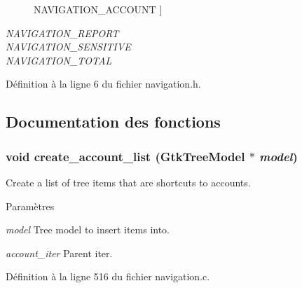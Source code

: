 \begin{Desc}
\begin{description}
{NAVIGATION\_\-ACCOUNT\label{navigation_8h_a3f7cf16a5e5b276a8744f42496c2c441a2bd700dd869e4529a09479b8e3a96cc6}
}]\item[{\em 
NAVIGATION\_\-REPORT\label{navigation_8h_a3f7cf16a5e5b276a8744f42496c2c441ad1379924ed0ede2912107c9394a0ec0e}
}]\item[{\em 
NAVIGATION\_\-SENSITIVE\label{navigation_8h_a3f7cf16a5e5b276a8744f42496c2c441a1be64db2d46a60171ef2e51bf02712cc}
}]\item[{\em 
NAVIGATION\_\-TOTAL\label{navigation_8h_a3f7cf16a5e5b276a8744f42496c2c441a21f3e1b489040eee5546d29c810275b4}
}]\end{description}
\end{Desc}



Définition à la ligne 6 du fichier navigation.h.



\subsection{Documentation des fonctions}
\subsubsection[{create\_\-account\_\-list}]{\setlength{\rightskip}{0pt plus 5cm}void create\_\-account\_\-list (GtkTreeModel $\ast$ {\em model})}\label{navigation_8h_a40d9073dbe6df6658ce1c5c45118cd22}
Create a list of tree items that are shortcuts to accounts.


\begin{DoxyParams}{Paramètres}
\item[{\em model}]Tree model to insert items into. \item[{\em account\_\-iter}]Parent iter. \end{DoxyParams}


Définition à la ligne 516 du fichier navigation.c.

